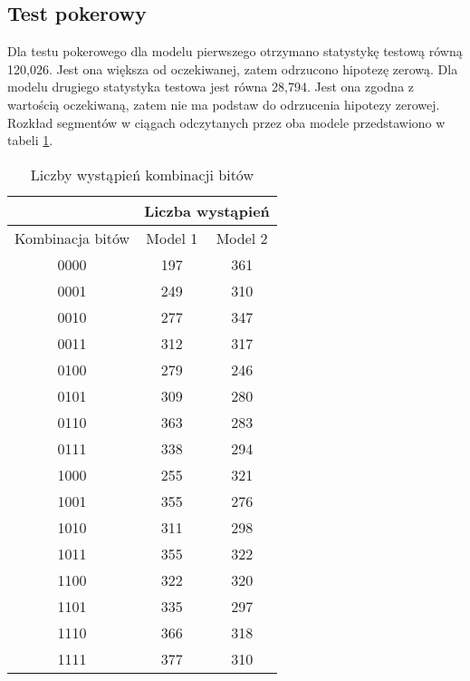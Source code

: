 \subsection{Test pokerowy}
\label{pokerWyniki}
Dla testu pokerowego dla modelu pierwszego otrzymano statystykę testową równą 120{,}026. Jest ona większa od oczekiwanej,
zatem odrzucono hipotezę zerową. Dla modelu drugiego statystyka testowa jest równa 28{,}794. Jest ona zgodna z wartością
oczekiwaną, zatem nie ma podstaw do odrzucenia hipotezy zerowej.
Rozkład segmentów w ciągach odczytanych przez oba modele przedstawiono w tabeli \ref{pokerTabela}.
\begin{table}[h]
    \centering
    \caption{Liczby wystąpień kombinacji bitów}
    \label{pokerTabela}
    \begin{tabular}{|c|c|c|} 
        \hline
        & \multicolumn{2}{c|}{Liczba wystąpień} \\
        \hline
        Kombinacja bitów & Model 1 & Model 2 \\
        \hline
        0000 & 197 & 361 \\
        \hline
        0001 & 249 & 310 \\
        \hline
        0010 & 277 & 347 \\
        \hline
        0011 & 312 & 317 \\
        \hline
        0100 & 279 & 246 \\
        \hline
        0101 & 309 & 280  \\
        \hline  
        0110 & 363 & 283 \\
        \hline  
        0111 & 338 & 294 \\
        \hline  
        1000 & 255 & 321 \\
        \hline  
        1001 & 355  & 276 \\
        \hline  
        1010 & 311 & 298 \\
        \hline  
        1011 & 355 & 322 \\
        \hline  
        1100 & 322 & 320 \\
        \hline  
        1101 & 335 & 297 \\
        \hline  
        1110 & 366 & 318 \\
        \hline  
        1111 & 377 & 310 \\
        \hline  
    \end{tabular} 
\end{table} 


